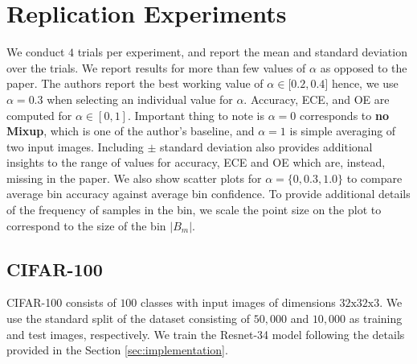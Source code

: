 \documentclass{article}
\begin{document}
\section{Replication Experiments}
\label{sec:experiments}
We conduct $4$ trials per experiment, and report the mean and standard deviation over the trials. We report results for more than few values of $\alpha$ as opposed to the paper. The authors report the best working value of $\alpha \in \lbrack 0.2, 0.4 \rbrack $ hence, we use $\alpha=0.3$ when selecting an individual value for $\alpha$. Accuracy, ECE, and OE are computed for $\alpha \in [0, 1]$. Important thing to note is $\alpha = 0$ corresponds to \textbf{no Mixup}, which is one of the author's baseline, and $\alpha=1$ is simple averaging of two input images. %
Including $\pm$ standard deviation also provides additional insights to the range of values for accuracy, ECE and OE which are, instead, missing in the paper.
We also show scatter plots for $\alpha=\{0, 0.3, 1.0\}$ to compare average bin accuracy against average bin confidence. To provide additional details of the frequency of samples in the bin, we scale the point size on the plot to correspond to the size of the bin $|B_m|$.


\subsection{CIFAR-100}
CIFAR-100 consists of $100$ classes with input images of dimensions $32\text{x}32\text{x}3$. We use the standard split of the dataset consisting of $50,000$ and $10,000$ as training and test images, respectively. We train the Resnet-34 model following the details provided in the Section \ref{sec:implementation}. 
\end{document}
